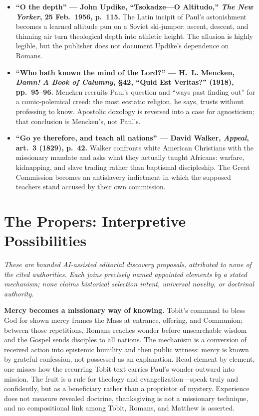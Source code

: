 {\small
\begin{itemize}
\item \textbf{``O the depth'' --- John Updike, ``Tsokadze---O Altitudo,'' \emph{The New Yorker}, 25 Feb.~1956, p.~115.} The Latin incipit of Paul's astonishment becomes a learned altitude pun on a Soviet ski-jumper: ascent, descent, and thinning air turn theological depth into athletic height. The allusion is highly legible, but the publisher does not document Updike's dependence on Romans.

\item \textbf{``Who hath known the mind of the Lord?'' --- H.~L. Mencken, \emph{Damn! A Book of Calumny}, §42, ``Quid Est Veritas?'' (1918), pp.~95--96.} Mencken recruits Paul's question and ``ways past finding out'' for a comic-polemical creed: the most ecstatic religion, he says, trusts without professing to know. Apostolic doxology is reversed into a case for agnosticism; that conclusion is Mencken's, not Paul's.

\item \textbf{``Go ye therefore, and teach all nations'' --- David Walker, \emph{Appeal}, art.~3 (1829), p.~42.} Walker confronts white American Christians with the missionary mandate and asks what they actually taught Africans: warfare, kidnapping, and slave trading rather than baptismal discipleship. The Great Commission becomes an antislavery indictment in which the supposed teachers stand accused by their own commission.
\end{itemize}
}

\section*{The Propers: Interpretive Possibilities}

\noindent\emph{These are bounded AI-assisted editorial discovery proposals, attributed to none of the cited authorities. Each joins precisely named appointed elements by a stated mechanism; none claims historical selection intent, universal novelty, or doctrinal authority.}

\noindent\textbf{Mercy becomes a missionary way of knowing.\enspace{}}
Tobit's command to bless God for shown mercy frames the Mass at entrance, offering, and Communion; between those repetitions, Romans reaches wonder before unsearchable wisdom and the Gospel sends disciples to all nations. The mechanism is a conversion of received action into epistemic humility and then public witness: mercy is known by grateful confession, not possessed as an explanation. Read element by element, one misses how the recurring Tobit text carries Paul's wonder outward into mission. The fruit is a rule for theology and evangelization---speak truly and confidently, but as a beneficiary rather than a proprietor of mystery. Experience does not measure revealed doctrine, thanksgiving is not a missionary technique, and no compositional link among Tobit, Romans, and Matthew is asserted.

